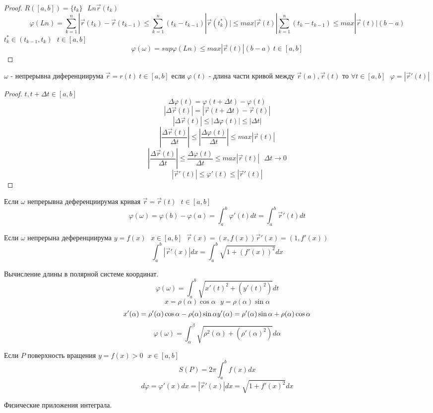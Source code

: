\begin{proof}
  $
  R([a,b]) = \{t_k\} ~~~ Ln \vec r (t_k)
  $
  $$
  \varphi (Ln) = \sum_{k=1}^n |\vec r (t_k) - \vec r (t_{k-1}) \le
  \sum_{k=1}^n (t_k - t_{k-1}) |\vec r (t_k^*)| \le max |\vec r (t)|
  \sum_{k=1}^n (t_k - t_{k-1}) \le max |\vec r (t)| (b-a)
  $$
  $t_k^* \in (t_{k-1}, t_k) ~~~ t \in [a,b]$
  $$
  \varphi (\omega) = sup \varphi (Ln) \le max |\vec r (t)|(b-a) ~ t \in [a,b]
  $$
\end{proof}

\begin{theorem}
  $\omega$ - непрерывна диференциирума $\vec r = r(t) ~ t \in [a,b]$ если
  $\varphi (t)$ - длина части кривой между $\vec r(a), \vec r(t)$ то
  $\forall t \in [a,b] ~~~ \varphi = |\vec r'(t)|$
\end{theorem}

\begin{proof}
  $t, t+\Delta t \in [a,b]$
  $$
  \Delta \varphi (t) = \varphi( t+\Delta t) - \varphi(t)
  $$
  $$
  |\Delta \vec r(t) | = |\vec r(t+\Delta t) - \vec r(t)|
  $$
  $$
  |\Delta \vec r(t)| \le |\Delta \varphi (t)| \le |\Delta t|
  $$
  $$
  \left| \frac{\Delta \vec r(t)}{\Delta t} \right| \le
  \left| \frac{\Delta \varphi (t)}{\Delta t} \right| \le
  max |\vec r(t)|
  $$
  $$
  \left| \frac{\Delta \vec r(t)}{\Delta t} \right| \le
  \frac{\Delta \varphi (t)}{\Delta t} \le
  max |\vec r(t)| ~~~ \Delta t \to 0
  $$
  $$
  |\vec r'(t)| \le \varphi'(t) \le |\vec r'(t)|
  $$
\end{proof}

  Если $\omega$ непрерывна деференциирумая кривая
$\vec r = \vec r(t) ~~~ t \in [a,b]$
$$
\varphi (\omega) = \varphi(b) - \varphi(a) =
\int_a^b \varphi'(t)dt =
\int_a^b \vec r'(t)dt
$$

  Если $\omega$ непрерына деференциирума $y = f(x) ~~~ x \in [a,b] ~~~
\vec r(x) = (x, f(x)) \vec r'(x) = (1, f'(x))$
$$
\int_a^b |\vec r'(x)|dx = \int_a^b \sqrt{1 + (f'(x))^2}dx
$$

  Вычисление длины в полярной системе координат.
$$
\varphi (\omega) = \int_a^b \sqrt{x'(t)^2 + (y'(t)^2)}dt
$$
$$
x = \rho (\alpha) \cos \alpha ~~~ y = \rho (\alpha) \sin \alpha
$$
$$
x'(\alpha) = \rho'(\alpha) \cos \alpha - \rho(\alpha) \sin \alpha \\
y'(\alpha) = \rho'(\alpha) \sin \alpha + \rho(\alpha) \cos \alpha
$$
$$
\varphi (\omega) = \int_{\alpha}^{\beta}
\sqrt{\rho^2 (\alpha) + (\rho'(\alpha)^2)} d\alpha
$$

  Если $P$ поверхность вращения $y=f(x) > 0 ~~~ x \in [a,b]$
$$
S(P) = 2\pi \int_a^b f(x)dx
$$
$$
d\varphi = \varphi' (x)dx = |\vec r'(x)|dx = \sqrt{1+f'(x)^2}dx
$$

\begin{title}[\Large]
  Физические приложения интеграла.
\end{title}

